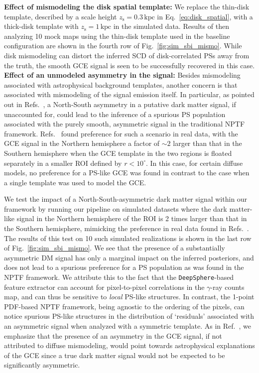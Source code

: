 \documentclass[prd,aps,10pt,nofootinbib,twocolumn,superscriptaddress,preprintnumbers,balancelastpage,longbibliography]{revtex4-1}
\begin{document}
\noindent
\textbf{Effect of mismodeling the disk spatial template:} 
We replace the thin-disk template, described by a scale height $z_\mathrm{s} = 0.3\,\mathrm{kpc}$ in Eq.~\eqref{eq:disk_spatial}, with a thick-disk template with $z_\mathrm{s} = 1\,\mathrm{kpc}$ in the simulated data. Results of then analyzing 10 mock maps using the thin-disk template used in the baseline configuration are shown in the fourth row of Fig.~\ref{fig:sim_sbi_mismo}. While disk mismodeling can distort the inferred SCD of disk-correlated PSs away from the truth, the smooth GCE signal is seen to be successfully recovered in this case. \\

\noindent
\textbf{Effect of an unmodeled asymmetry in the signal:}
Besides mismodeling associated with astrophysical background templates, another concern is that associated with mismodeling of the signal emission itself. In particular, as pointed out in Refs.~\cite{Leane:2020nmi,Leane:2020pfc}, a North-South asymmetry in a putative dark matter signal, if unaccounted for, could lead to the inference of a spurious PS population associated with the purely smooth, asymmetric signal in the traditional NPTF framework. Refs.~\cite{Leane:2020nmi,Leane:2020pfc} found preference for such a scenario in real \Fermi data, with the GCE signal in the Northern hemisphere a factor of $\sim2$ larger than that in the Southern hemisphere when the GCE template in the two regions is floated separately in a smaller ROI defined by $r < 10^\circ$. In this case, for certain diffuse models, no preference for a PS-like GCE was found in contrast to the case when a single template was used to model the GCE. 

We test the impact of a North-South-asymmetric dark matter signal within our framework by running our pipeline on simulated datasets where the dark matter-like signal in the Northern hemisphere of the ROI is 2 times larger than that in the Southern hemisphere, mimicking the preference in real data found in Refs.~\cite{Leane:2020nmi,Leane:2020pfc}. The results of this test on 10 such simulated realizations is shown in the last row of Fig.~\ref{fig:sim_sbi_mismo}. We see that the presence of a substantially asymmetric DM signal has only a marginal impact on the inferred posteriors, and does not lead to a spurious preference for a PS population as was found in the NPTF framework. We attribute this to the fact that the \texttt{DeepSphere}-based feature extractor can account for pixel-to-pixel correlations in the $\gamma$-ray counts map, and can thus be sensitive to \emph{local} PS-like structures. In contrast, the 1-point PDF-based NPTF framework, being agnostic to the ordering of the pixels, can notice spurious PS-like structures in the distribution of `residuals' associated with an asymmetric signal when analyzed with a symmetric template.
As in Ref.~\cite{Buschmann:2020adf}, we emphasize that the presence of an asymmetry in the GCE signal, if not attributed to diffuse mismodeling, would point towards astrophysical explanations of the GCE since a true dark matter signal would not be expected to be significantly asymmetric.
\end{document}
